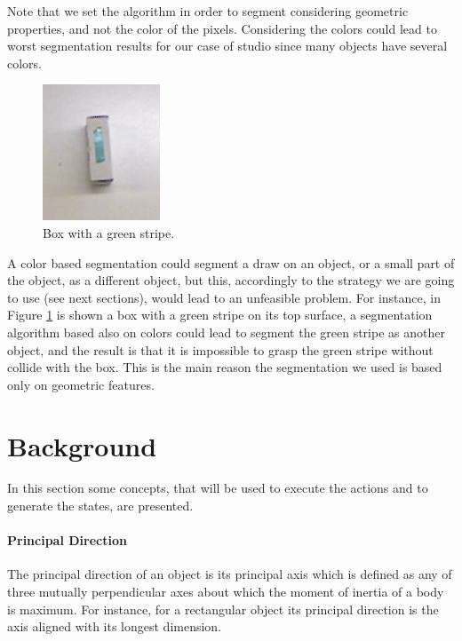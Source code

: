 Note that we set the algorithm in order to segment considering geometric properties, and not the color of the pixels. Considering the colors could lead to worst segmentation results for our case of studio since many objects have several colors.

\begin{figure}
\centering
\caption{Box with a green stripe.}\label{fig:seg_color}
\includegraphics[width=3.5cm]{Img/ObjectSegmentation/color_seg_problem.png}
\end{figure}
A color based segmentation could segment a draw on an object, or a small part of the object, as a different object, but this, accordingly to the strategy we are going to use (see next sections), would lead to an unfeasible problem. 
For instance, in Figure \ref{fig:seg_color} is shown a box with a green stripe on its top surface, a segmentation algorithm based also on colors could lead to segment the green stripe as another object, and the result is that it is impossible to grasp the green stripe without collide with the box. This is the main reason the segmentation we used is based only on geometric features. 

\section{Background}
\label{sec:background_alg}

In this section some concepts, that will be used to execute the actions and to generate the states, are presented. 

\paragraph{Principal Direction}
The principal direction of an object is its principal axis which is defined as any of three mutually perpendicular axes about which the moment of inertia of a body is maximum. For instance, for a rectangular object its principal direction is the axis aligned with its longest dimension. 

